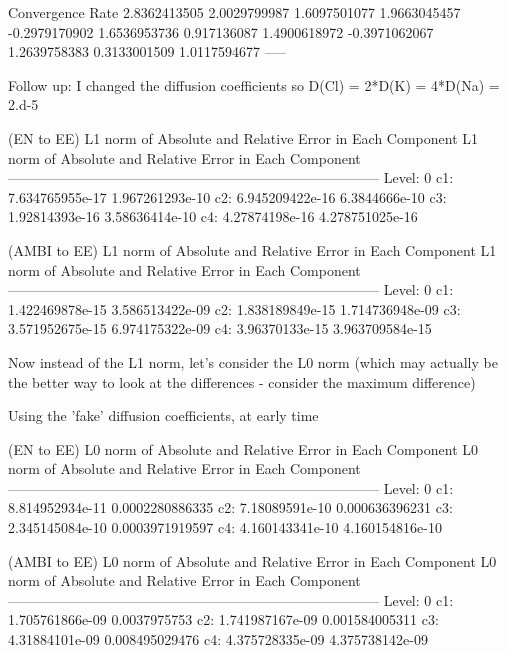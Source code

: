 \documentclass[final]{siamltex}
\begin{document}
Convergence Rate		
2.8362413505	2.0029799987	1.6097501077	1.9663045457
-0.2979170902	1.6536953736	0.917136087	1.4900618972
-0.3971062067	1.2639758383	0.3133001509	1.0117594677
-----

Follow up: I changed the diffusion coefficients so D(Cl) = 2*D(K) = 4*D(Na) = 2.d-5

(EN to EE) L1 norm of Absolute and Relative Error in Each Component
L1 norm of Absolute and Relative Error in Each Component
--------------------------------------------------------------------------------
Level:  0
                                c1:      7.634765955e-17     1.967261293e-10
                                c2:      6.945209422e-16       6.3844666e-10
                                c3:       1.92814393e-16      3.58636414e-10
                                c4:       4.27874198e-16     4.278751025e-16

(AMBI to EE) L1 norm of Absolute and Relative Error in Each Component
L1 norm of Absolute and Relative Error in Each Component
--------------------------------------------------------------------------------
Level:  0
                                c1:      1.422469878e-15     3.586513422e-09
                                c2:      1.838189849e-15     1.714736948e-09
                                c3:      3.571952675e-15     6.974175322e-09
                                c4:       3.96370133e-15     3.963709584e-15


Now instead of the L1 norm, let's consider the L0 norm (which may actually be
the better way to look at the differences - consider the maximum difference)

Using the 'fake' diffusion coefficients, at early time

(EN to EE) L0 norm of Absolute and Relative Error in Each Component
L0 norm of Absolute and Relative Error in Each Component
--------------------------------------------------------------------------------
Level:  0
                                c1:      8.814952934e-11     0.0002280886335
                                c2:       7.18089591e-10      0.000636396231
                                c3:      2.345145084e-10     0.0003971919597
                                c4:      4.160143341e-10     4.160154816e-10


(AMBI to EE) L0 norm of Absolute and Relative Error in Each Component
L0 norm of Absolute and Relative Error in Each Component
--------------------------------------------------------------------------------
Level:  0
                                c1:      1.705761866e-09        0.0037975753
                                c2:      1.741987167e-09      0.001584005311
                                c3:       4.31884101e-09      0.008495029476
                                c4:      4.375728335e-09     4.375738142e-09
\end{document}
